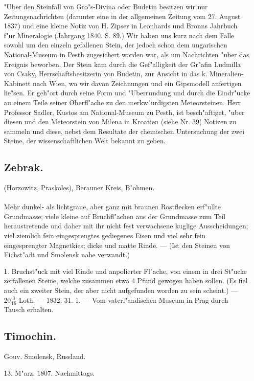 \documentclass[a4paper, 11pt, oneside, polutonikogreek, german]{article}
\begin{document}
"Uber den Steinfall von Gro"s-Divina oder Budetin besitzen wir nur Zeitungsnachrichten (darunter eine in der allgemeinen Zeitung vom 27. August 1837) und eine kleine Notiz von H. Zipser in Leonhards und Bronns Jahrbuch f"ur Mineralogie (Jahrgang 1840. S. 89.) Wir haben uns kurz nach dem Falle sowohl um den einzeln gefallenen Stein, der jedoch schon dem ungarischen National-Museum in Pesth zugesichert worden war, als um Nachrichten "uber das Ereignis beworben. Der Stein kam durch die Gef"alligkeit der Gr"afin Ludmilla von Csaky, Herrschaftsbesitzerin von Budetin, zur Ansicht in das k. Mineralien-Kabinett nach Wien, wo wir davon Zeichnungen und ein Gipsmodell anfertigen lie"sen. Er geh"ort durch seine Form und "Uberrundung und durch die Eindr"ucke au einem Teile seiner Oberfl"ache zu den merkw"urdigsten Meteorsteinen. Herr Professor Sadler, Kustos am National-Museum zu Pesth, ist besch"aftiget, "uber diesen und den Meteorstein von Milena in Kroatien (siehe Nr. 39) Notizen zu sammeln und diese, nebst dem Resultate der chemischen Untersuchung der zwei Steine, der wissenschaftlichen Welt bekannt zu geben.
\subsection{Zebrak.}
\begin{center}
\small
(Horzowitz, Praskoles), Berauner Kreis, B"ohmen.
\end{center}
\paragraph{}
Mehr dunkel- als lichtgraue, aber ganz mit braunen Rostflecken erf"ullte Grundmasse; viele kleine auf Bruchfl"achen aus der Grundmasse zum Teil heraustretende und daher mit ihr nicht fest verwachsene kuglige Ausscheidungen; viel ziemlich fein eingesprengtes gediegenes Eisen und viel sehr fein eingesprengter Magnetkies; dicke und matte Rinde. --- (Ist den Steinen von Eichst"adt und Smolensk nahe verwandt.)

1. Bruchst"uck mit viel Rinde und anpolierter Fl"ache, von einem in drei St"ucke zerfallenen Steine, welche zusammen etwa 4 Pfund gewogen haben sollen. (Es fiel auch ein zweiter Stein, der aber nicht aufgefunden worden zu sein scheint.) --- $20\frac{3}{16}$ Loth. --- 1832. 31. 1. --- Vom vaterl"andischen Museum in Prag durch Tausch erhalten.
\subsection{Timochin.}
\begin{center}
\small
Gouv. Smolensk, Russland.

13. M"arz, 1807. Nachmittags.
\end{center}
\end{document}
